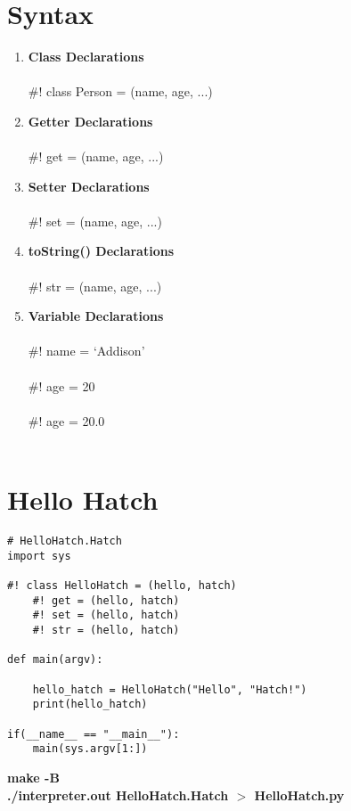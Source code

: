 \documentclass[12pt]{article}
\begin{document}
\section{Syntax}
\begin{enumerate}
\item{\textbf{Class Declarations}} \\ \\
\#! class Person = (name, age, ...)
\item{\textbf{Getter Declarations}} \\ \\
\#! get = (name, age, ...)
\item{\textbf{Setter Declarations}} \\ \\
\#! set = (name, age, ...)
\item{\textbf{toString() Declarations}} \\ \\
\#! str = (name, age, ...)
\item{\textbf{Variable Declarations}} \\ \\
\#! name = `Addison' \\ \\
\#! age = 20 \\ \\
\#! age = 20.0 \\ \\
\end{enumerate}


\section{Hello Hatch}

\begin{lstlisting}
# HelloHatch.Hatch
import sys

#! class HelloHatch = (hello, hatch)
	#! get = (hello, hatch)
	#! set = (hello, hatch)
	#! str = (hello, hatch)

def main(argv):

	hello_hatch = HelloHatch("Hello", "Hatch!")
	print(hello_hatch)

if(__name__ == "__main__"):
	main(sys.argv[1:])
\end{lstlisting}
\textbf{make -B} \\
\textbf{./interpreter.out HelloHatch.Hatch $>$ HelloHatch.py} \\
\end{document}
